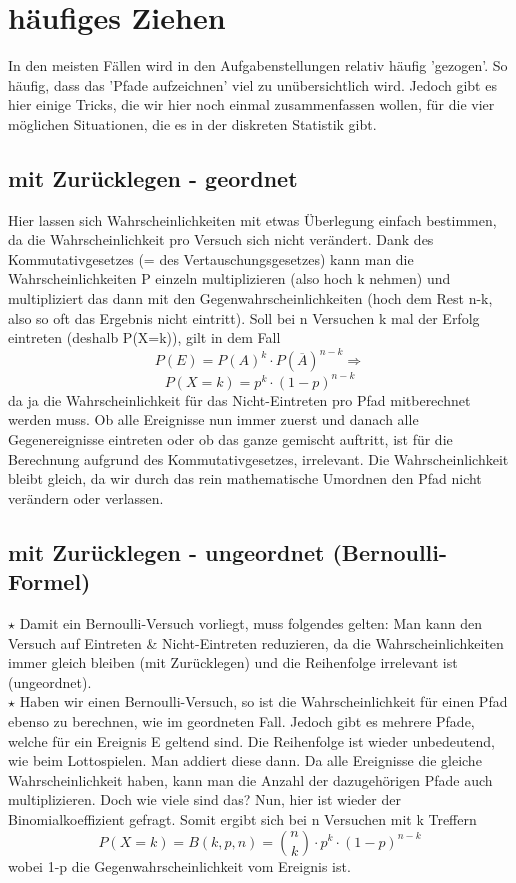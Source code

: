 \section{häufiges Ziehen}
In den meisten Fällen wird in den Aufgabenstellungen relativ häufig 'gezogen'. So häufig, dass das 'Pfade aufzeichnen' viel zu unübersichtlich wird. Jedoch gibt es hier einige Tricks, die wir hier noch einmal zusammenfassen wollen, für die vier möglichen Situationen, die es in der diskreten Statistik gibt.

\subsection{mit Zurücklegen - geordnet}
Hier lassen sich Wahrscheinlichkeiten mit etwas Überlegung einfach bestimmen, da die Wahrscheinlichkeit pro Versuch sich nicht verändert. Dank des Kommutativgesetzes (= des Vertauschungsgesetzes) kann man die Wahrscheinlichkeiten P einzeln multiplizieren (also hoch k nehmen) und multipliziert das dann mit den Gegenwahrscheinlichkeiten (hoch dem Rest n-k, also so oft das Ergebnis nicht eintritt). Soll bei n Versuchen k mal der Erfolg eintreten (deshalb P(X=k)), gilt in dem Fall
\[P(E)=P(A)^k\cdot P(\overline{A})^{n-k} \Rightarrow\]
\[P(X=k)=p^k\cdot (1-p)^{n-k}\]
da ja die Wahrscheinlichkeit für das Nicht-Eintreten pro Pfad mitberechnet werden muss. Ob alle Ereignisse nun immer zuerst und danach alle Gegenereignisse eintreten oder ob das ganze gemischt auftritt, ist für die Berechnung aufgrund des Kommutativgesetzes, irrelevant. Die Wahrscheinlichkeit bleibt gleich, da wir durch das rein mathematische Umordnen den Pfad nicht verändern oder verlassen.

\subsection{mit Zurücklegen - ungeordnet (Bernoulli-Formel)}
\(\star\) Damit ein Bernoulli-Versuch vorliegt, muss folgendes gelten: Man kann den Versuch auf Eintreten \& Nicht-Eintreten reduzieren, da die Wahrscheinlichkeiten immer gleich bleiben (mit Zurücklegen) und die Reihenfolge irrelevant ist (ungeordnet).\\
\(\star\) Haben wir einen Bernoulli-Versuch, so ist die Wahrscheinlichkeit für einen Pfad ebenso zu berechnen, wie im geordneten Fall. Jedoch gibt es mehrere Pfade, welche für ein Ereignis E geltend sind. Die Reihenfolge ist wieder unbedeutend, wie beim Lottospielen. Man addiert diese dann. Da alle Ereignisse die gleiche Wahrscheinlichkeit haben, kann man die Anzahl der dazugehörigen Pfade auch multiplizieren. Doch wie viele sind das? Nun, hier ist wieder der Binomialkoeffizient gefragt. Somit ergibt sich bei n Versuchen mit k Treffern
\[P(X=k)=B(k,p,n)=\binom{n}{k}\cdot p^k\cdot (1-p)^{n-k}\]
wobei 1-p die Gegenwahrscheinlichkeit vom Ereignis ist.
